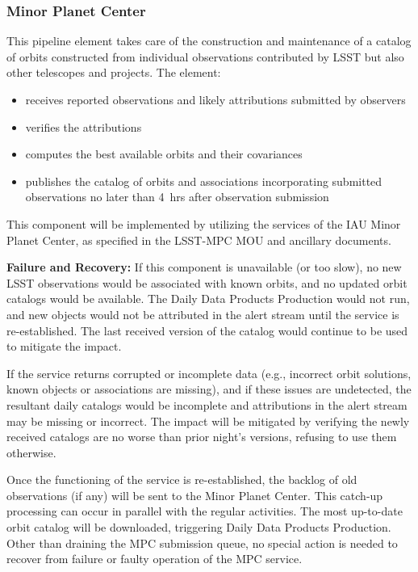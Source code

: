 \subsubsection{Minor Planet Center}

This pipeline element takes care of the construction and maintenance of a catalog of orbits constructed from individual observations contributed by LSST but also other telescopes and projects. The element:
\begin{itemize}
	\item receives reported observations and likely attributions submitted by observers
	\item verifies the attributions
	\item computes the best available orbits and their covariances
	\item publishes the catalog of orbits and associations incorporating submitted observations no later than 4~hrs after observation submission
\end{itemize}

This component will be implemented by utilizing the services of the IAU Minor Planet Center, as specified in the LSST-MPC MOU and ancillary documents.

{\bf Failure and Recovery:} If this component is unavailable (or too slow), no new LSST observations would be associated with known orbits, and no updated orbit catalogs would be available. The Daily Data Products Production would not run, and new objects would not be attributed in the alert stream until the service is re-established. The last received version of the catalog would continue to be used to mitigate the impact.

If the service returns corrupted or incomplete data (e.g., incorrect orbit solutions, known objects or associations are missing), and if these issues are undetected, the resultant daily catalogs would be incomplete and \SSObject attributions in the alert stream may be missing or incorrect. The impact will be mitigated by verifying the newly received catalogs are no worse than prior night's versions, refusing to use them otherwise.

Once the functioning of the service is re-established, the backlog of old observations (if any) will be sent to the Minor Planet Center. This catch-up processing can occur in parallel with the regular activities. The most up-to-date orbit catalog will be downloaded, triggering Daily Data Products Production. Other than draining the MPC submission queue, no special action is needed to recover from failure or faulty operation of the MPC service.

